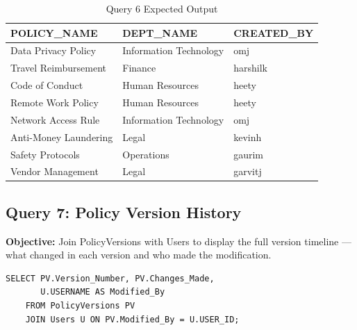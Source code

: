 \documentclass[conference]{IEEEtran}
\begin{document}
\begin{table}[H]
\centering
\caption{Query 6 Expected Output}
\begin{tabular}{|l|l|l|}
\hline
\textbf{POLICY\_NAME} & \textbf{DEPT\_NAME} & \textbf{CREATED\_BY} \\
\hline
Data Privacy Policy    & Information Technology & omj      \\
Travel Reimbursement   & Finance                & harshilk \\
Code of Conduct        & Human Resources        & heety    \\
Remote Work Policy     & Human Resources        & heety    \\
Network Access Rule    & Information Technology & omj      \\
Anti-Money Laundering  & Legal                  & kevinh   \\
Safety Protocols       & Operations             & gaurim   \\
Vendor Management      & Legal                  & garvitj  \\
\hline
\end{tabular}
\end{table}

\subsection{Query 7: Policy Version History}

\textbf{Objective:} Join PolicyVersions with Users to display the full version timeline — what changed in each version and who made the modification.

\begin{lstlisting}[style=sqlstyle, caption={Query 7: Version History (JOIN)}]
SELECT PV.Version_Number, PV.Changes_Made,
       U.USERNAME AS Modified_By
    FROM PolicyVersions PV
    JOIN Users U ON PV.Modified_By = U.USER_ID;
\end{lstlisting}
\end{document}
